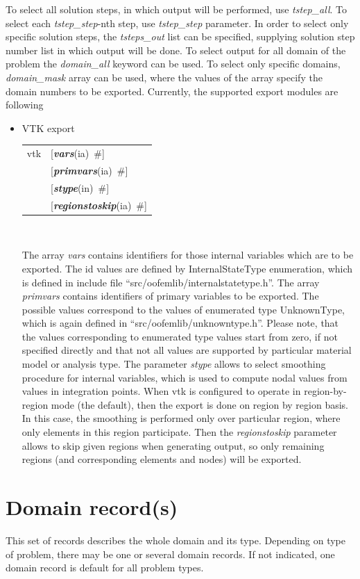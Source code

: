 \documentclass[a4paper]{article}
\makeatletter
\newcommand{\param}[1]{{\em #1}}
\newcommand{\keywordnotype}[1]{\mbox{{\it{\bf{#1}}}}}
\newcommand{\keyword}[2]{\mbox{{\keywordnotype{#1}\tiny (#2)}}}
\newcommand{\field}[2]{\mbox{\keyword{#1}{#2}~\#}}
\newcommand{\optField}[2]{\mbox{[\field{#1}{#2}]}}
\newenvironment{record}[1][]{\begin{tabular}{|ll}}{\end{tabular}\\}
\newcommand{\recentry}[2]{{#1}&{#2}\\}
\newcounter{rcc}
\newenvironment{record}[1][\textwidth]{\setcounter{rcc}{0}\begin{tabular*}{#1}{|ll@{\extracolsep{\fill}}r}}{\end{tabular*}\\}
\newcommand{\recentry}[2]{\ifthenelse{\value{rcc}>0}{&$\backslash$ \\}{\setcounter{rcc}{1}}{#1}&{#2}}
\makeatother
\begin{document}
To select all solution steps, in which output will be performed, use
\param{tstep\_all}. To select each \param{tstep\_step}-nth step, use
\param{tstep\_step} parameter. In order to select only specific
solution steps, the \param{tsteps\_out} list can be specified,
supplying solution step number list in which output will be done.
To select output for all domain of the problem the \param{domain\_all}
keyword can be used. To select only specific domains,
\param{domain\_mask} array can be used, where the values of the array
specify the domain numbers to be exported.
Currently, the supported export modules are following
\begin{itemize}
\item VTK export

  \begin{record}[0.9\textwidth]
    \recentry{vtk}{\optField{vars}{ia}} \recentry{}{\optField{primvars}{ia}}
    \recentry{}{\optField{stype}{in}} \recentry{}{\optField{regionstoskip}{ia}}
  \end{record}

The array \param{vars} contains identifiers for those internal
variables which are to be exported. The id values are defined by
InternalStateType enumeration, which is defined in include file
``src/oofemlib/internalstatetype.h''.
The array \param{primvars}
contains identifiers of primary variables to be exported.
The possible values correspond to the values of enumerated type
UnknownType, which is again defined in ``src/oofemlib/unknowntype.h''.
Please note, that the values corresponding to enumerated type values
start from zero, if not specified directly and that not all values are
supported by particular material model or analysis type.
The parameter \param{stype} allows to select smoothing procedure for
internal variables, which is used to compute nodal values from values
in integration points.
When vtk is configured to operate in region-by-region mode (the default), then the export is done on region by region basis. In this case, the smoothing is performed only over particular region, where only elements in this region participate. Then the \param{regionstoskip} parameter allows to skip given regions when generating output, so only remaining regions (and corresponding elements and nodes) will be exported.
\end{itemize}

\section{Domain record(s)}
\label{_DomainRecord}
This set of records describes the whole domain and its type. Depending
on type of problem, there may be one or several domain records. If not
indicated, one domain record is default for all problem types.
\end{document}
